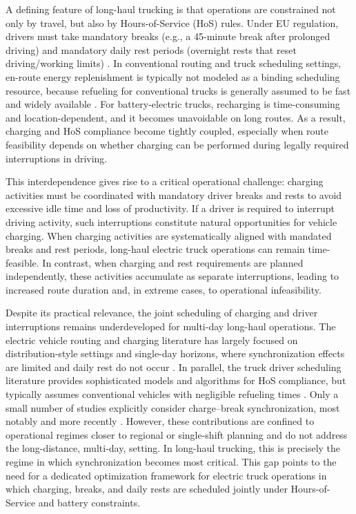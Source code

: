 \documentclass[3p,11pt,authoryear]{elsarticle}  %
\begin{document}
    A defining feature of long-haul trucking is that operations are constrained not only by travel, but also by Hours-of-Service (HoS) rules. Under EU regulation, drivers must take mandatory breaks (e.g., a 45-minute break after prolonged driving)%
    and mandatory daily rest periods (overnight rests that reset driving/working limits) \cite{goel2017exact}. In conventional routing and truck scheduling settings, en-route energy replenishment is typically not modeled as a binding scheduling resource, because refueling for conventional trucks is generally assumed to be fast and widely available \citep{schulz2024ipc}. For battery-electric trucks, recharging is time-consuming and location-dependent, and it becomes unavoidable on long routes. As a result, charging and HoS compliance become tightly coupled, especially when route feasibility depends on whether charging can be performed during legally required interruptions in driving.

    This interdependence gives rise to a critical operational challenge: charging activities must be coordinated with mandatory driver breaks and rests to avoid excessive idle time and loss of productivity. If a driver is required to interrupt driving activity, such interruptions constitute natural opportunities for vehicle charging. When charging activities are systematically aligned with mandated breaks and rest periods, long-haul electric truck operations can remain time-feasible. In contrast, when charging and rest requirements are planned independently, these activities accumulate as separate interruptions, leading to increased route duration and, in extreme cases, to operational infeasibility.

    Despite its practical relevance, the joint scheduling of charging and driver interruptions remains underdeveloped for multi-day long-haul operations. The electric vehicle routing and charging literature has largely focused on distribution-style settings and single-day horizons, where synchronization effects are limited and daily rest do not occur \citep{han2025uncertainty,bruglieri2023matheuristic}. In parallel, the truck driver scheduling literature provides sophisticated models and algorithms for HoS compliance, but typically assumes conventional vehicles with negligible refueling times \citep{ammann2023synchronization}. Only a small number of studies explicitly consider charge–break synchronization, most notably \cite{schiffer2017impact} and more recently \cite{brockmann2025breakandcharge}. However, these contributions are confined to operational regimes closer to regional or single-shift planning and do not address the long-distance, multi-day, setting. In long-haul trucking, this is precisely the regime in which synchronization becomes most critical. This gap points to the need for a dedicated optimization framework for electric truck operations in which charging, breaks, and daily rests are scheduled jointly under Hours-of-Service and battery constraints.
\end{document}
